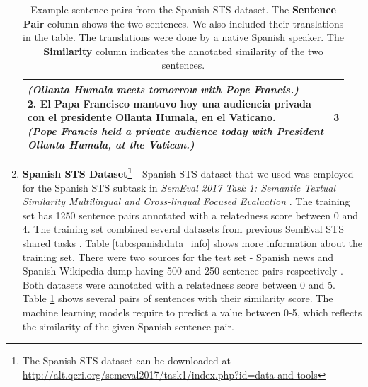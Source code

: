 \begin{enumerate}
\begin{table}[ht!]
\begin{tabular}{l|c}
{			\textit{(Ollanta Humala meets tomorrow with Pope Francis.)} \\ 
			2. El Papa Francisco mantuvo hoy una audiencia privada \\ con el presidente Ollanta Humala, en el Vaticano. \\
			\textit{(Pope Francis held a private audience today with President} \\ \textit{Ollanta Humala, at the Vatican.)}} & 3  \\
		\hline               
	\end{tabular}
	\caption[Example sentence pairs from the Spanish STS dataset]{Example sentence pairs from the Spanish STS dataset. The \textbf{Sentence Pair} column shows the two sentences. We also included their translations in the table. The translations were done by a native Spanish speaker. The \textbf{Similarity} column indicates the annotated similarity of the two sentences. }
	\label{tab:spanishdata}
\end{table} 
	

\item{ \textbf{Spanish STS Dataset\footnote{The Spanish STS dataset can be downloaded at \url{http://alt.qcri.org/semeval2017/task1/index.php?id=data-and-tools}}}} - Spanish STS dataset that we used was employed for the Spanish STS subtask in \textit{SemEval 2017 Task 1: Semantic Textual Similarity Multilingual and Cross-lingual Focused Evaluation} \autocite{cer-etal-2017-semeval}. The training set has 1250 sentence pairs annotated with a relatedness score between 0 and 4. The training set combined several datasets from previous SemEval STS shared tasks \autocite{cer-etal-2017-semeval}. Table \ref{tab:spanishdata_info} shows more information about the training set. There were two sources for the test set - Spanish news and Spanish Wikipedia dump having 500 and 250 sentence pairs respectively \autocite{cer-etal-2017-semeval}. Both datasets were annotated with a relatedness score between 0 and 5. Table \ref{tab:spanishdata} shows several pairs of sentences with their similarity score. The machine learning models require to predict a value between 0-5, which reflects the similarity of the given Spanish sentence pair.



\end{enumerate}
